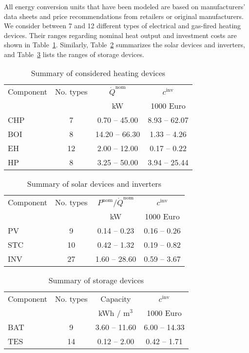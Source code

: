 All energy conversion units that have been modeled are based on manufacturers' data sheets and price recommendations from retailers or original manufacturers.
We consider between 7 and 12 different types of electrical and gas-fired heating devices.
Their ranges regarding nominal heat output and investment costs are shown in Table~\ref{tab: parameters heating devices}.
Similarly, Table~\ref{tab: parameters solar devices} summarizes the solar devices and inverters, and Table~\ref{tab: parameters storage devices} lists the ranges of storage devices.


\begin{table}[h!]
	\caption{Summary of considered heating devices}
	\centering
	\begin{tabular}[l]{@{}lccc}
		\hline
		Component 	& No. types	& $\dot{Q}^\mathrm{nom}$& $c^\mathrm{inv}$ \\
					&  			& kW 					& 1000 Euro \\
		\hline
		CHP 		& 7 		& 0.70 -- 45.00 		& 8.93 -- 62.07\\
		BOI 		& 8 		& 14.20 -- 66.30 		& 1.33 -- 4.26\\
		EH 			& 12 		& 2.00 -- 12.00 		& 0.17 -- 0.22\\
		HP 			& 8 		& 3.25 -- 50.00 		& 3.94 -- 25.44\\
		\hline
	\end{tabular}
	\label{tab: parameters heating devices}
\end{table}

\begin{table}[h!]
	\caption{Summary of solar devices and inverters}
	\centering
	\begin{tabular}[l]{@{}lccc}
		\hline
		Component 	& No. types	& $P^\mathrm{nom}$/$\dot{Q}^\mathrm{nom}$& $c^\mathrm{inv}$ \\
		&  			& kW 					& 1000 Euro \\
		\hline
		PV 			& 9 		& 0.14 -- 0.23 		& 0.16 -- 0.26\\
		STC 		& 10 		& 0.42 -- 1.32 		& 0.19 -- 0.82\\
		INV			& 27 		& 1.60 -- 28.60 	& 0.59 -- 3.67\\
		\hline
	\end{tabular}
	\label{tab: parameters solar devices}
\end{table}

\begin{table}[h!]
	\caption{Summary of storage devices}
	\centering
	\begin{tabular}[l]{@{}lccc}
		\hline
		Component 	& No. types	& Capacity 		& $c^\mathrm{inv}$ \\
					&  			& kWh / m$^3$ 	& 1000 Euro \\
		\hline
		BAT 		& 9 		& 3.60 -- 11.60		& 6.00 -- 14.33\\
		TES 		& 14 		& 0.12 -- 2.00 		& 0.42 -- 1.71\\
		\hline
	\end{tabular}
	\label{tab: parameters storage devices}
\end{table}

